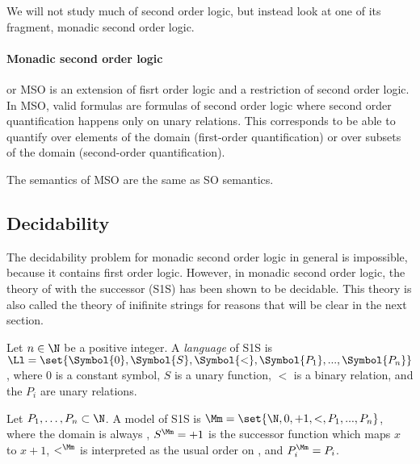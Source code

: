 We will not study much of second order logic, but instead
look at one of its fragment, monadic second order logic.

\paragraph*{Monadic second order logic} or MSO is an extension of
fisrt order logic and a restriction of second order logic.
In MSO, valid formulas are formulas of second order logic
where second order quantification happens only on unary relations.
This corresponds to be able to quantify over elements
of the domain (first-order quantification)
or over subsets of the domain (second-order quantification).

The semantics of MSO are the same as SO semantics.





\subsection{Decidability}


The decidability problem for monadic second order logic
in general is impossible, because it contains first order logic.
However, in monadic second order logic, the theory of \N with
the successor (S1S) has been shown to be decidable.
This theory is also called the theory of inifinite strings
for reasons that will be clear in the next section.

\begin{definition}
    Let $n \in \N$ be a positive integer.
    A \emph{language}  of S1S is $\Ll = \set{\Symbol{0}, \Symbol{S}, \Symbol{<}, \Symbol{P_1}, ..., \Symbol{P_n}}$,
    where $0$ is a constant symbol, $S$ is a unary function,
    $<$ is a binary relation, and the $P_i$ are unary relations.

    Let $P_1, \dots, P_n \subset \N$. A model of S1S is
    $\Mm = \set{\N, 0, +1, <, P_1, ..., P_n}$,
    where the domain is always \N, $S^\Mm = +1$ is the successor function
    which maps $x$ to $x+1$, $<^\Mm$ is interpreted as the usual order
    on \N, and $P_i^\Mm = P_i$.

\end{definition}

